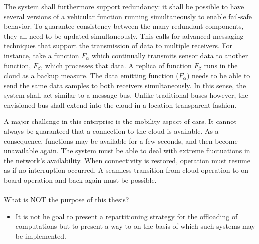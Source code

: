 The system shall furthermore support redundancy: it shall be possible to have several versions of a vehicular function running simultaneously to enable fail-safe behavior. To guarantee consistency between the many redundant components, they all need to be updated simultaneously. This calls for advanced messaging techniques that support the transmission of data to multiple receivers. For instance, take a function $F_\alpha$ which continually transmits sensor data to another function, $F_\beta$, which processes that data. A replica of function $F_\beta$ runs in the cloud as a backup measure. The data emitting function ($F_\alpha$) needs to be able to send the same data samples to both receivers simultaneously. In this sense, the system shall act similar to a message bus. Unlike traditional buses however, the envisioned bus shall extend into the cloud in a location-transparent fashion.

A major challenge in this enterprise is the mobility aspect of cars. It cannot always be guaranteed that a connection to the cloud is available. As a consequence, functions may be available for a few seconds, and then become unavailable again. The system must be able to deal with extreme fluctuations in the network's availability. When connectivity is restored, operation must resume as if no interruption occurred. A seamless transition from cloud-operation to on-board-operation and back again must be possible.


\paragraph{}

What is NOT the purpose of this thesis?
\begin{itemize}
\item It is not he goal to present a repartitioning strategy for the offloading of computations but to present a way to on the basis of which such systems may be implemented.
\end{itemize}


%
%
%
%
%
%
%
%
%
%


